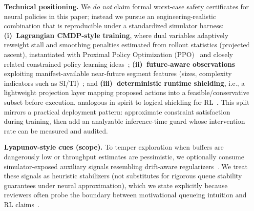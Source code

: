 \documentclass[preprint,12pt]{elsarticle}
\begin{document}
\textbf{Technical positioning.}
We \emph{do not} claim formal worst-case safety certificates for neural policies in this paper; instead we pursue an engineering-realistic combination that is reproducible under a standardized simulator harness:
\textbf{(i)~Lagrangian CMDP-style training}, where dual variables adaptively reweight stall and smoothing penalties estimated from rollout statistics (projected ascent), instantiated with Proximal Policy Optimization (PPO)~\cite{schulman2017proximal} and closely related constrained policy learning ideas~\cite{achiam2017constrained};
\textbf{(ii)~future-aware observations} exploiting manifest-available near-future segment features (sizes, complexity indicators such as SI/TI)~\cite{sodagar2011mpeg}; and
\textbf{(iii)~deterministic runtime shielding}, i.e., a lightweight projection layer mapping proposed actions into a feasible/conservative subset before execution, analogous in spirit to logical shielding for RL~\cite{tian2022towards,xiao2025qoe,alshiekh2018shielding}.
This split mirrors a practical deployment pattern: approximate constraint satisfaction during training, then add an analyzable inference-time guard whose intervention rate can be measured and audited.

\textbf{Lyapunov-style cues (scope).}
To temper exploration when buffers are dangerously low or throughput estimates are pessimistic, we optionally consume simulator-exposed auxiliary signals resembling drift-aware regularizers~\cite{neely2010stochastic}.
We treat these signals as heuristic stabilizers (not substitutes for rigorous queue stability guarantees under neural approximation), which we state explicitly because reviewers often probe the boundary between motivational queueing intuition and RL claims~\cite{neely2010stochastic}.
\end{document}
